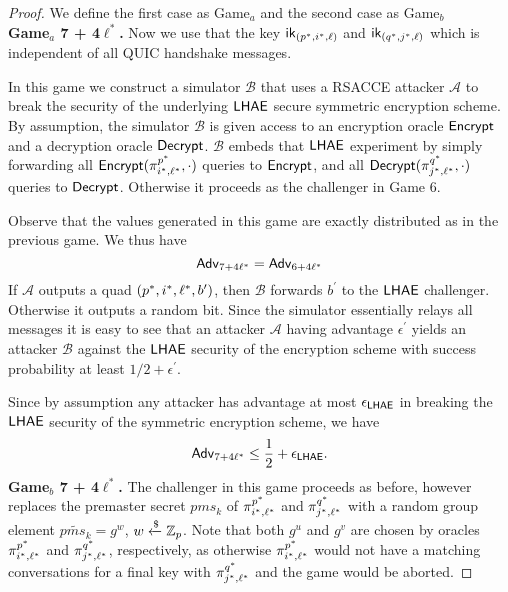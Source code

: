 \begin{proof}
 We define the first case as Game$_{a}$ and the second case as Game$_{b}$
\vspace{10pt}\\%
%
%
 \textbf{Game$_a$ 7 + 4$\ell^{\ast}$.} Now we use that the key $\mathsf{ik}_{(p^{\ast}, i^{\ast}, \ell)}$ and $\mathsf{ik}_{(q^{\ast}, j^{\ast}, \ell)}$ which is independent of all QUIC handshake messages.

 In this game we construct a simulator $\mathcal{B}$ that uses a RSACCE attacker $\mathcal{A}$ to break the security of the underlying $\mathsf{LHAE}$ secure symmetric encryption scheme. By assumption, the simulator $\mathcal{B}$ is given access to an encryption oracle $\mathsf{Encrypt}$ and a decryption oracle $\mathsf{Decrypt}$. $\mathcal{B}$ embeds that $\mathsf{LHAE}$ experiment by simply forwarding all $\mathsf{Encrypt}(\pi^{p^{\ast}}_{i^{\ast},\ell^{\ast}},\cdot)$ queries to $\mathsf{Encrypt}$, and all $\mathsf{Decrypt}(\pi^{q^{\ast}}_{j^{\ast},\ell^{\ast}},\cdot)$ queries to $\mathsf{Decrypt}$. Otherwise it proceeds as the challenger in Game 6.

 Observe that the values generated in this game are exactly distributed as in the previous game. We thus have
 \begin{equation}
  \mathsf{Adv}_{7 + 4\ell^{\ast}} = \mathsf{Adv}_{6 + 4\ell^{\ast}}
 \end{equation}%
 If $\mathcal{A}$ outputs a quad $(p^{\ast}, i^{\ast}, \ell^{\ast}, b^{\prime})$, then $\mathcal{B}$ forwards $b^{\prime}$ to the $\mathsf{LHAE}$ challenger. Otherwise it outputs a random bit. Since the simulator essentially relays all messages it is easy to see that an attacker $\mathcal{A}$ having advantage $\epsilon^{\prime}$ yields an attacker $\mathcal{B}$ against the $\mathsf{LHAE}$ security of the encryption scheme with success probability at least $1/2 + \epsilon^{\prime}$.

 Since by assumption any attacker has advantage at most $\epsilon_{\mathsf{LHAE}}$ in breaking the $\mathsf{LHAE}$ security of the symmetric encryption scheme, we have
 \begin{equation}
  \mathsf{Adv}_{7 + 4\ell^{\ast}} \leq \frac{1}{2} + \epsilon_{\mathsf{LHAE}}.
 \end{equation}%
%
%
 \textbf{Game$_b$ 7 + 4$\ell^{\ast}$.} The challenger in this game proceeds as before, however replaces the premaster secret $pms_{k}$ of $\pi^{p^{\ast}}_{i^{\ast},\ell^{\ast}}$ and $\pi^{q^{\ast}}_{j^{\ast},\ell^{\ast}}$ with a random group element $\widetilde{pms_{k}} = g^w$, $w \xleftarrow{\$} \mathbb{Z}_p$. Note that both $g^u$ and $g^v$ are chosen by oracles $\pi^{p^{\ast}}_{i^{\ast},\ell^{\ast}}$ and $\pi^{q^{\ast}}_{j^{\ast},\ell^{\ast}}$, respectively, as otherwise $\pi^{p^{\ast}}_{i^{\ast},\ell^{\ast}}$ would not have a matching conversations for a final key with $\pi^{q^{\ast}}_{j^{\ast},\ell^{\ast}}$ and the game would be aborted.


\end{proof}
